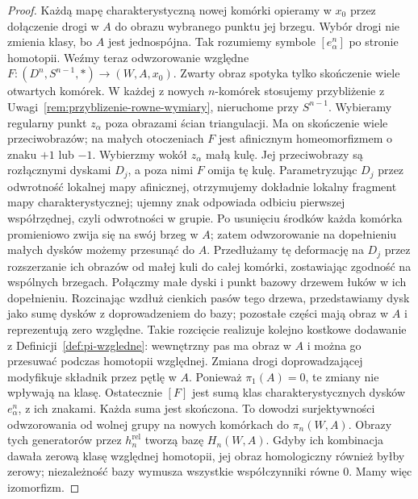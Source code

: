 \documentclass[11pt,a4paper,oneside]{report}
\theoremstyle{plain}
\theoremstyle{definition}
\theoremstyle{remark}
\begin{document}
\begin{proof}
Każdą mapę charakterystyczną nowej komórki opieramy w $x_0$
przez dołączenie drogi w $A$ do obrazu wybranego punktu jej brzegu.
Wybór drogi nie zmienia klasy, bo $A$ jest jednospójna.
Tak rozumiemy symbole $[e_\alpha^n]$ po stronie homotopii.
Weźmy teraz odwzorowanie względne
$F:(D^n,S^{n-1},*)\to(W,A,x_0)$.
Zwarty obraz spotyka
tylko skończenie wiele
otwartych komórek.
W każdej z nowych $n$-komórek stosujemy przybliżenie
z Uwagi~\ref{rem:przyblizenie-rowne-wymiary}, nieruchome przy $S^{n-1}$.
Wybieramy regularny punkt $z_\alpha$ poza obrazami ścian triangulacji.
Ma on skończenie wiele przeciwobrazów; na małych otoczeniach
$F$ jest afinicznym homeomorfizmem o znaku $+1$ lub $-1$.
Wybierzmy wokół $z_\alpha$ małą kulę. Jej przeciwobrazy są rozłącznymi
dyskami $D_j$, a poza nimi $F$ omija tę kulę.
Parametryzując $D_j$ przez odwrotność lokalnej mapy afinicznej,
otrzymujemy dokładnie lokalny fragment mapy charakterystycznej;
ujemny znak odpowiada odbiciu pierwszej współrzędnej, czyli odwrotności w grupie. Po usunięciu
środków każda komórka
promieniowo zwija się
na swój brzeg w $A$;
zatem odwzorowanie na dopełnieniu
małych dysków możemy
przesunąć do $A$.
Przedłużamy tę deformację na $D_j$ przez rozszerzanie ich obrazów
od małej kuli do całej komórki, zostawiając zgodność na wspólnych brzegach.
Połączmy małe dyski i punkt bazowy drzewem łuków w ich dopełnieniu.
Rozcinając wzdłuż cienkich pasów tego drzewa, przedstawiamy dysk
jako sumę dysków z doprowadzeniem do bazy; pozostałe części mają obraz w $A$
i reprezentują zero względne. Takie rozcięcie realizuje kolejno
kostkowe dodawanie z Definicji~\ref{def:pi-wzgledne}:
wewnętrzny pas ma obraz w $A$ i można go przesuwać podczas homotopii względnej.
Zmiana drogi doprowadzającej modyfikuje składnik przez pętlę w $A$.
Ponieważ $\pi_1(A)=0$, te zmiany nie wpływają na klasę.
Ostatecznie $[F]$ jest sumą klas charakterystycznych dysków
$e_\alpha^n$, z ich znakami. Każda suma jest skończona.
To dowodzi surjektywności
odwzorowania od wolnej grupy
na nowych komórkach
do $\pi_n(W,A)$.
Obrazy tych generatorów
przez $h_n^{\mathrm{rel}}$
tworzą bazę
$H_n(W,A)$. Gdyby ich
kombinacja dawała
zerową klasę względnej
homotopii, jej obraz
homologiczny również
byłby zerowy; niezależność
bazy wymusza wszystkie
współczynniki równe $0$.
Mamy więc izomorfizm.


\end{proof}
\end{document}

